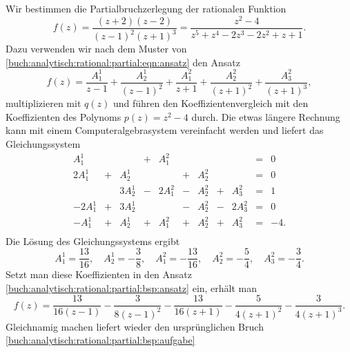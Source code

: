 \begin{beispiel}
Wir bestimmen die Partialbruchzerlegung der rationalen Funktion
\begin{equation}
f(z)
=
\frac{(z+2)(z-2)}{(z-1)^2(z+1)^3}
=
\frac{z^2-4}{z^5+z^4-2z^3-2z^2+z+1}.
\label{buch:analytisch:rational:partial:bsp:aufgabe}
\end{equation}
Dazu verwenden wir nach dem Muster von
\eqref{buch:analytisch:rational:partial:eqn:ansatz}
den Ansatz
\begin{equation}
f(z)
=
\frac{A^1_1}{z-1}
+
\frac{A^1_2}{(z-1)^2}
+
\frac{A^2_1}{z+1}
+
\frac{A^2_2}{(z+1)^2}
+
\frac{A^2_3}{(z+1)^3},
\label{buch:analytisch:rational:partial:bsp:ansatz}
\end{equation}
multiplizieren mit $q(z)$ und führen den Koeffizientenvergleich
mit den Koeffizienten des Polynoms $p(z)=z^2-4$ durch.
Die etwas längere Rechnung kann mit einem Computeralgebrasystem
vereinfacht werden und liefert das Gleichungssystem
\[
\renewcommand{\arraycolsep}{2pt}
\renewcommand{\arraystretch}{1.3}
\begin{array}{rcrcrcrcrcr}
  A^1_1 & &        &+&  A^2_1 & &       & &        &=&  0\phantom{.}\\
 2A^1_1 &+&  A^1_2 & &        &+& A^2_2 & &        &=&  0\phantom{.}\\
        & & 3A^1_2 &-& 2A^2_1 &-& A^2_2 &+&  A^2_3 &=&  1\phantom{.}\\
-2A^1_1 &+& 3A^1_2 & &        &-& A^2_2 &-& 2A^2_3 &=&  0\phantom{.}\\
- A^1_1 &+&  A^1_2 &+&  A^2_1 &+& A^2_2 &+&  A^2_3 &=& -4.\\
\end{array}
\]
Die Lösung des Gleichungssystems ergibt
\[
A^1_1 =  \frac{13}{16},\quad
A^1_2 = -\frac{ 3}{ 8},\quad
A^2_1 = -\frac{13}{16},\quad
A^2_2 = -\frac{ 5}{ 4},\quad
A^2_3 = -\frac{ 3}{ 4}.
\]
Setzt man diese Koeffizienten in den Ansatz
\eqref{buch:analytisch:rational:partial:bsp:ansatz}
ein, erhält man
\[
f(z)
=
\frac{13}{16(z-1)  }
-
\frac{ 3}{ 8(z-1)^2}
-
\frac{13}{16(z+1)  }
-
\frac{ 5}{ 4(z+1)^2}
-
\frac{ 3}{ 4(z+1)^3}.
\]
Gleichnamig machen liefert wieder den ursprünglichen Bruch
\eqref{buch:analytisch:rational:partial:bsp:aufgabe}
\end{beispiel}

%
%
